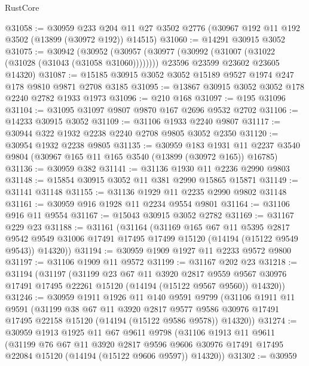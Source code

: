 \begin{lexlean}{RustCore}
\begin{coremodule}
@31058 := @30959
    @233
    @204
    @11
    @27
    @3502
    @2776
    (@30967 @192 @11 @192 @3502 (@13899 (@30972 @192)) @14515)
@31060 := @14291 @30915 @3052
@31075 := @30942
    (@30952
      (@30957 (@30977 (@30992 (@31007 (@31022 (@31028 (@31043 (@31058 @31060))))))))
      @23596
      @23599
      @23602
      @23605
      @14320)
@31087 := @15185 @30915 @3052 @3052 @15189 @9527 @1974 @247 @178 @9810 @9871 @2708 @3185
@31095 := @13867 @30915 @3052 @3052 @178 @2240 @2782 @1933 @1973
@31096 := @210 @168
@31097 := @195 @31096
@31104 := @31095 @31097 @9807 @9870 @167 @2696 @9532 @2702
@31106 := @14233 @30915 @3052
@31109 := @31106 @1933 @2240 @9807
@31117 := @30944 @322 @1932 @2238 @2240 @2708 @9805 @3052 @2350
@31120 := @30954 @1932 @2238 @9805
@31135 := @30959
    @183
    @1931
    @11
    @2237
    @3540
    @9804
    (@30967 @165 @11 @165 @3540 (@13899 (@30972 @165)) @16785)
@31136 := @30959 @382
@31141 := @31136 @1930 @11 @2236 @2990 @9803
@31148 := @15854 @30915 @3052 @11 @381 @2990 @15865 @15871
@31149 := @31141 @31148
@31155 := @31136 @1929 @11 @2235 @2990 @9802 @31148
@31161 := @30959 @916 @1928 @11 @2234 @9554 @9801
@31164 := @31106 @916 @11 @9554
@31167 := @15043 @30915 @3052 @2782
@31169 := @31167 @229 @23
@31188 := @31161
    (@31164
      (@31169
        @165
        @67
        @11
        @5395
        @2817
        @9542
        @9549
        @31006
        @17491
        @17495
        @17499
        @15120
        (@14194 (@15122 @9549 @9543))
        @14320))
@31194 := @30959 @1909 @1927 @11 @2233 @9572 @9800
@31197 := @31106 @1909 @11 @9572
@31199 := @31167 @202 @23
@31218 := @31194
    (@31197
      (@31199
        @23
        @67
        @11
        @3920
        @2817
        @9559
        @9567
        @30976
        @17491
        @17495
        @22261
        @15120
        (@14194 (@15122 @9567 @9560))
        @14320))
@31246 := @30959
    @1911
    @1926
    @11
    @140
    @9591
    @9799
    (@31106
      @1911
      @11
      @9591
      (@31199
        @38
        @67
        @11
        @3920
        @2817
        @9577
        @9586
        @30976
        @17491
        @17495
        @22158
        @15120
        (@14194 (@15122 @9586 @9578))
        @14320))
@31274 := @30959
    @1913
    @1925
    @11
    @67
    @9611
    @9798
    (@31106
      @1913
      @11
      @9611
      (@31199
        @76
        @67
        @11
        @3920
        @2817
        @9596
        @9606
        @30976
        @17491
        @17495
        @22084
        @15120
        (@14194 (@15122 @9606 @9597))
        @14320))
@31302 := @30959

\end{coremodule}
\end{lexlean}
